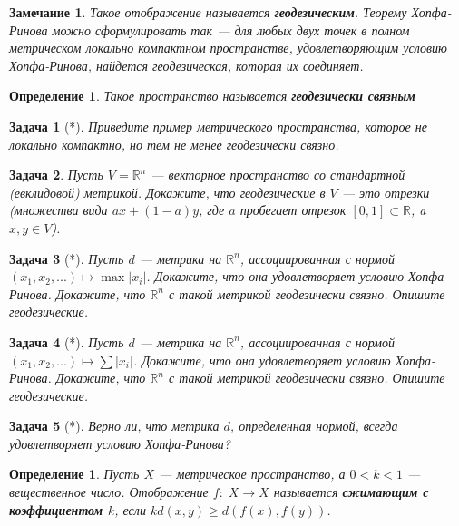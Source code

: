 \documentclass[12pt]{book}
\def\R{{\mathbb R}}
\theoremstyle{upshape}
\newtheorem{zadacha}{Задача}[chapter]
\theoremstyle{generic}
\newtheorem{opredelenie}[teorema]{Определение}
\theoremstyle{upshapenonumber}
\newtheorem{zamechanie}{Замечание}[chapter]
\newcommand{\следствие}{%
     \refstepcounter{teorema}
     {\noindent\bf Следствие \thechapter.\arabic{teorema}:\ }}
\newcommand{\пример}{%
     \refstepcounter{teorema}
     {\noindent\bf Пример \thechapter.\arabic{teorema}:\ }}
\newcommand{\лемма}{%
     \refstepcounter{teorema}
     {\noindent\bf Лемма \thechapter.\arabic{teorema}:\ }}
\newcommand{\теорема}{%
     \refstepcounter{teorema}
     {\noindent\bf Теорема \thechapter.\arabic{teorema}:\ }}
\newcommand{\утверждение}{%
     \refstepcounter{teorema}
     {\noindent\bf Утверждение \thechapter.\arabic{teorema}:\ }}
\begin{document}
{\begin{zamechanie} Такое отображение называется {\bf
геодезическим}. Теорему Хопфа-Ринова можно сформулировать так --- для
любых двух точек в полном метрическом локально компактном
пространстве, удовлетворяющим условию Хопфа-Ринова, найдется
геодезическая, которая их соединяет.
\end{zamechanie}

\begin{opredelenie} 
Такое пространство называется {\bf геодезически связным}
\end{opredelenie}

\begin{zadacha}[*] Приведите пример метрического пространства,
которое не локально компактно, но тем не менее геодезически связно.
\end{zadacha}

\begin{zadacha} Пусть $V= \R^n$ --- векторное пространство со стандартной 
(евклидовой) метрикой. Докажите, что геодезические в $V$ --- это отрезки
(множества вида $a x + (1-a) y$, где $a$ пробегает отрезок $[0, 1]
\subset \R$, a $x, y \in V$).
\end{zadacha}

\begin{zadacha}[*] Пусть $d$ --- метрика на $\R^n$, ассоциированная
с нормой $(x_1, x_2, ... ) \mapsto \max |x_i|$. Докажите, что она
удовлетворяет условию Хопфа-Ринова. Докажите, что $\R^n$ с такой
метрикой геодезически связно. Опишите геодезические.
\end{zadacha}

\begin{zadacha}[*] Пусть $d$ --- метрика на $\R^n$, ассоциированная
с нормой $(x_1, x_2, ... ) \mapsto \sum |x_i|$. Докажите, что она
удовлетворяет условию Хопфа-Ринова. Докажите, что $\R^n$ с такой
метрикой геодезически связно. Опишите геодезические.
\end{zadacha}

\begin{zadacha}[*] Верно ли, что метрика $d$, определенная 
нормой, всегда удовлетворяет условию Хопфа-Ринова?
\end{zadacha}

\begin{opredelenie} Пусть $X$ --- метрическое пространство,
а $0<k<1$ --- вещественное число. Отображение $f:\; X \to X$
называется {\bf сжимающим с коэффициентом $k$}, если $k d(x,y) \geq 
d(f(x), f(y))$.
\end{opredelenie}

}
\end{document}
